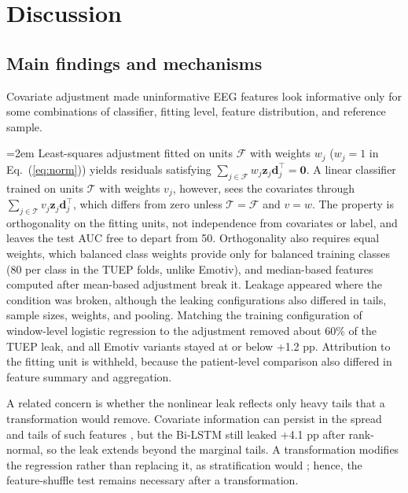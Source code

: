 \documentclass[final,1p,times]{elsarticle}
\renewcommand{\eqref}[1]{Eq.~(\ref{#1})}
\begin{document}
\section{Discussion}\label{sec:discussion}

\subsection{Main findings and mechanisms}\label{sec:disk_temuan}

Covariate adjustment made uninformative EEG features look informative only for some combinations of classifier, fitting level, feature distribution, and reference sample.

\begingroup\emergencystretch=2em Least-squares adjustment fitted on units $\mathcal{F}$ with weights $w_j$ ($w_j=1$ in \eqref{eq:norm}) yields residuals satisfying $\sum_{j\in\mathcal{F}} w_j\mathbf{z}_j\mathbf{d}_j^{\top}=\mathbf{0}$. A linear classifier trained on units $\mathcal{T}$ with weights $v_j$, however, sees the covariates through $\sum_{j\in\mathcal{T}} v_j\mathbf{z}_j\mathbf{d}_j^{\top}$, which differs from zero unless $\mathcal{T}=\mathcal{F}$ and $v=w$. The property is orthogonality on the fitting units, not independence from covariates or label, and leaves the test AUC free to depart from 50. Orthogonality also requires equal weights, which balanced class weights provide only for balanced training classes (80 per class in the TUEP folds, unlike Emotiv), and median-based features computed after mean-based adjustment break it. Leakage appeared where the condition was broken, although the leaking configurations also differed in tails, sample sizes, weights, and pooling. Matching the training configuration of window-level logistic regression to the adjustment removed about 60\% of the TUEP leak, and all Emotiv variants stayed at or below +1.2 pp. Attribution to the fitting unit is withheld, because the patient-level comparison also differed in feature summary and aggregation.\par\endgroup

A related concern is whether the nonlinear leak reflects only heavy tails that a transformation would remove. Covariate information can persist in the spread and tails of such features \cite{hamdan2023}, but the Bi-LSTM still leaked +4.1 pp after rank-normal, so the leak extends beyond the marginal tails. A transformation modifies the regression rather than replacing it, as stratification would \cite{hamdan2023}; hence, the feature-shuffle test remains necessary after a transformation.
\end{document}
